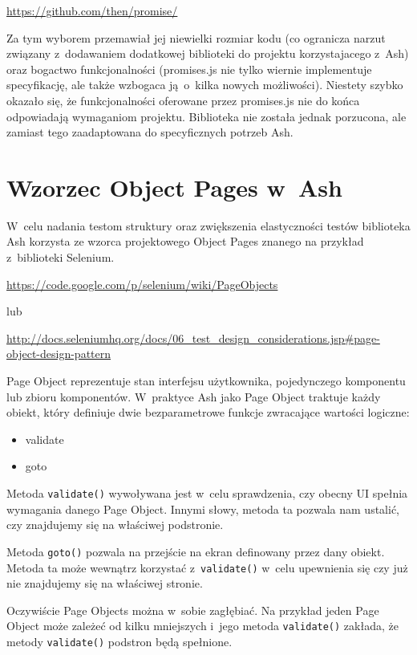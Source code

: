 \documentclass[brudnopis]{xmgr}
\begin{document}
\url{https://github.com/then/promise/}

Za tym wyborem przemawiał jej niewielki rozmiar kodu (co ogranicza narzut związany z~dodawaniem dodatkowej biblioteki do projektu korzystajacego z~Ash) oraz bogactwo funkcjonalności (promises.js nie tylko wiernie implementuje specyfikację, ale także wzbogaca ją~o~kilka nowych możliwości). Niestety szybko okazało się, że funkcjonalności oferowane przez promises.js nie do końca odpowiadają wymaganiom projektu. Biblioteka nie została jednak porzucona, ale zamiast tego zaadaptowana do specyficznych potrzeb Ash.  

\section{Wzorzec Object Pages w~Ash}

W~celu nadania testom struktury oraz zwiększenia elastyczności testów biblioteka Ash korzysta ze wzorca projektowego Object Pages znanego na przykład z~biblioteki Selenium. 

\url{https://code.google.com/p/selenium/wiki/PageObjects}

lub

\url{http://docs.seleniumhq.org/docs/06\_test\_design\_considerations.jsp\#page-object-design-pattern}

Page Object reprezentuje stan interfejsu użytkownika, pojedynczego komponentu lub zbioru komponentów. W~praktyce Ash jako Page Object traktuje każdy obiekt, który definiuje dwie bezparametrowe funkcje zwracające wartości logiczne:

\begin{itemize}
  \item validate
  \item goto
\end{itemize}

Metoda \texttt{validate()} wywoływana jest w~celu sprawdzenia, czy obecny UI spełnia wymagania danego Page Object. Innymi słowy, metoda ta pozwala nam ustalić, czy znajdujemy się na właściwej podstronie. 

Metoda \texttt{goto()} pozwala na przejście na ekran definowany przez dany obiekt. Metoda ta może wewnątrz korzystać z~\texttt{validate()} w~celu upewnienia się czy już nie znajdujemy się na właściwej stronie. 

Oczywiście Page Objects można w~sobie zagłębiać. Na przykład jeden Page Object może zależeć od kilku mniejszych i~jego metoda \texttt{validate()} zakłada, że metody \texttt{validate()} podstron będą spełnione. 
\end{document}
